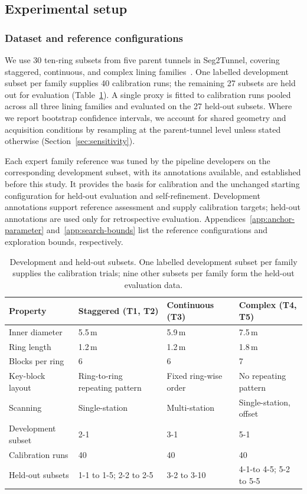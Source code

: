 \documentclass[a4paper,fleqn]{cas-dc}
\begin{document}
\subsection{Experimental setup}
\label{sec:exp-setup}

\subsubsection{Dataset and reference configurations}
\label{sec:dataset}
We use 30 ten-ring subsets from five parent tunnels in Seg2Tunnel, covering staggered, continuous, and complex lining families~\cite{lin2024seg2tunnel}. One labelled development subset per family supplies 40 calibration runs; the remaining 27 subsets are held out for evaluation (Table~\ref{tab:dataset}). A single proxy is fitted to calibration runs pooled across all three lining families and evaluated on the 27 held-out subsets. Where we report bootstrap confidence intervals, we account for shared geometry and acquisition conditions by resampling at the parent-tunnel level unless stated otherwise (Section~\ref{sec:sensitivity}).


Each expert family reference was tuned by the pipeline developers on the corresponding development subset, with its annotations available, and established before this study. It provides the basis for calibration and the unchanged starting configuration for held-out evaluation and self-refinement. Development annotations support reference assessment and supply calibration targets; held-out annotations are used only for retrospective evaluation. Appendices~\ref{app:anchor-parameter} and~\ref{app:search-bounds} list the reference configurations and exploration bounds, respectively.

\begin{table}[t]
\caption{Development and held-out subsets. One labelled development subset per family supplies the calibration trials; nine other subsets per family form the held-out evaluation data.}
\label{tab:dataset}
\centering
\begin{tabular}{p{} p{} p{} p{}}
\toprule
Property & Staggered (T1, T2) & Continuous (T3) & Complex (T4, T5) \\
\midrule
Inner diameter & 5.5\,m & 5.9\,m & 7.5\,m \\
Ring length & 1.2\,m & 1.2\,m & 1.8\,m \\
Blocks per ring & 6 & 6 & 7 \\
Key-block layout & Ring-to-ring repeating pattern & Fixed ring-wise order & No repeating pattern \\
Scanning & Single-station & Multi-station & Single-station, offset \\
Development subset & 2-1 & 3-1 & 5-1 \\
Calibration runs & 40 & 40 & 40 \\
Held-out subsets & 1-1 to 1-5; 2-2 to 2-5 & 3-2 to 3-10 & 4-1-to 4-5; 5-2 to 5-5 \\
\bottomrule
\end{tabular}
\end{table}
\end{document}
